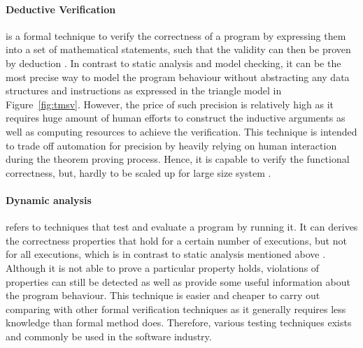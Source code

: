 \paragraph{Deductive Verification} is a formal technique to verify the correctness of a program by expressing them into a set of mathematical statements, such that the validity can then be proven by deduction \cite{Filliatre2011, Hahnle_introductiondeductive}. In contrast to static analysis and model checking, it can be the most precise way to model the program behaviour without abstracting any data structures and instructions as expressed in the triangle model in Figure~\ref{fig:tmsv}. However, the price of such precision is relatively high as it requires huge amount of human efforts to construct the inductive arguments as well as computing resources to achieve the verification. This technique is intended to trade off automation for precision by heavily relying on human interaction during the theorem proving process. Hence, it is capable to verify the functional correctness, but, hardly to be scaled up for large size system \cite{CousotCousot09-Marktoberdorf}. 


\paragraph{Dynamic analysis} refers to techniques that test and evaluate a program by running it. It can derives the correctness properties that hold for a certain number of executions, but not for all executions, which is in contrast to static analysis mentioned above \cite{Ball:1999:CDA:318774.318944}. Although it is not able to prove a particular property holds, violations of properties can still be detected as well as provide some useful information about the program behaviour. This technique is easier and cheaper to carry out comparing with other formal verification techniques as it generally requires less knowledge than formal method does. Therefore, various testing techniques exists and commonly be used in the software industry. 

